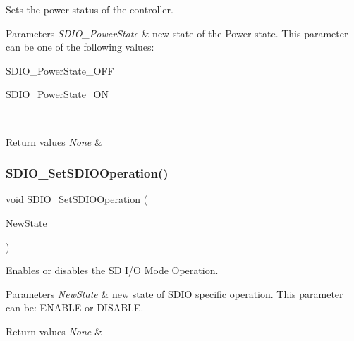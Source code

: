 Sets the power status of the controller. 


\begin{DoxyParams}{Parameters}
{\em S\+D\+I\+O\+\_\+\+Power\+State} & new state of the Power state. This parameter can be one of the following values\+: \begin{DoxyItemize}
\item S\+D\+I\+O\+\_\+\+Power\+State\+\_\+\+O\+FF \item S\+D\+I\+O\+\_\+\+Power\+State\+\_\+\+ON \end{DoxyItemize}
\\
\hline
\end{DoxyParams}

\begin{DoxyRetVals}{Return values}
{\em None} & \\
\hline
\end{DoxyRetVals}
\mbox{\label{group___s_d_i_o___exported___functions_ga24e210c185d5a7855cbaff4472a8f8d1}} 
\subsubsection{\texorpdfstring{SDIO\_SetSDIOOperation()}{SDIO\_SetSDIOOperation()}}
{\footnotesize\ttfamily void S\+D\+I\+O\+\_\+\+Set\+S\+D\+I\+O\+Operation (\begin{DoxyParamCaption}\item[{\mbox{\hyperlink{group___exported__types_gac9a7e9a35d2513ec15c3b537aaa4fba1}{Functional\+State}}}]{New\+State }\end{DoxyParamCaption})}



Enables or disables the SD I/O Mode Operation. 


\begin{DoxyParams}{Parameters}
{\em New\+State} & new state of S\+D\+IO specific operation. This parameter can be\+: E\+N\+A\+B\+LE or D\+I\+S\+A\+B\+LE. \\
\hline
\end{DoxyParams}

\begin{DoxyRetVals}{Return values}
{\em None} & \\
\hline
\end{DoxyRetVals}
\mbox{\label{group___s_d_i_o___exported___functions_ga2baac4ea1bb6c2d94345d2712604338a}} 
